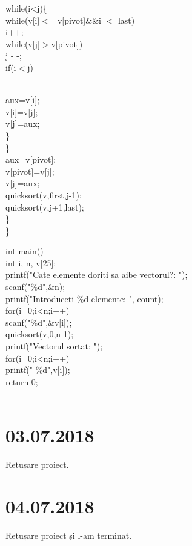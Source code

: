 \documentclass{report}
\begin{document}
      while(i<j)\{\\
         while(v[i]\(<\)=v[pivot]\&\&i \(<\) last)\\
            i++;\\
         while(v[j]\(>\)v[pivot])\\
            j - -;\\
         if(i\(<\)j){\\
            aux=v[i];\\
            v[i]=v[j];\\
            v[j]=aux;\\
         \}\\
      \}\\

      aux=v[pivot];\\
      v[pivot]=v[j];\\
      v[j]=aux;\\
      quicksort(v,first,j-1);\\
      quicksort(v,j+1,last);\\

   \}\\
\}

int main(){\\
   int i, n, v[25];\\

   printf("Cate elemente doriti sa aibe vectorul?: ");\\
   scanf("\%d",\&n);\\

   printf("Introduceti \%d elemente: ", count);\\
   for(i=0;i<n;i++)\\
      scanf("\%d",\&v[i]);\\

   quicksort(v,0,n-1);\\

   printf("Vectorul sortat: ");\\
   for(i=0;i<n;i++)\\
      printf(" \%d",v[i]);\\

   return 0;\\
}\\


\chapter{03.07.2018}
Retușare proiect.
\chapter{04.07.2018}
Retușare proiect și l-am terminat.
}
\end{document}
